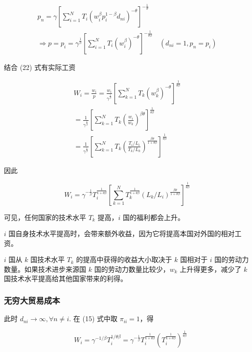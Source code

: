\documentclass[
]{article}
\begin{document}
\[
\begin{array}{l}{p_{n}=\gamma\left[\sum_{i=1}^{N} T_{i}\left(w_{i}^{\beta} p_{i}^{1-\beta} d_{n i}\right)^{-\theta}\right]^{-\frac{1}{\theta}}} \\ {\Rightarrow p=p_{i}=\gamma^{\frac{1}{\beta}}\left[\sum_{i=1}^{N} T_{i}\left(w_{i}^{\beta}\right)^{-\theta}\right]^{-\frac{1}{\theta \beta}} \quad\left(d_{n i}=1, p_{n}=p_{i}\right)}\end{array}
\]

结合 (22) 式有实际工资

\[
\begin{array}{l}{W_{i}=\frac{w_{i}}{p}=\frac{w_{i}}{\gamma^{\frac{1}{\beta}}}\left[\sum_{k=1}^{N} T_{k}\left(w_{k}^{\beta}\right)^{-\theta}\right]^{\frac{1}{\theta \beta}}} \\ {=\frac{1}{\gamma^{\frac{1}{\beta}}}\left[\sum_{k=1}^{N} T_{k}\left(\frac{w_{i}}{w_{k}}\right)^{\beta \theta}\right]^{\frac{1}{\theta \beta}}} \\ {=\frac{1}{\gamma^{\frac{1}{\beta}}}\left[\sum_{k=1}^{N} T_{k}\left(\frac{T_{i} / L_{i}}{T_{k} / L_{k}}\right)^{\frac{\beta \theta}{1+\theta \beta}}\right]^{\frac{1}{\theta \beta}}}\end{array}
\]

因此

\[
W_{i}=\gamma^{-\frac{1}{\beta}} T_{i}^{\frac{1}{1+\theta \beta}}\left[\sum_{k=1}^{N} T_{k}^{\frac{1}{1+\theta \beta}}\left(L_{k} / L_{i}\right)^{\frac{\beta \theta}{1+\theta \beta}}\right]^{\frac{1}{\theta \beta}} \tag{23}
\]

可见，任何国家的技术水平 \(T_k\) 提高，\(i\) 国的福利都会上升。

\(i\) 国自身技术水平提高时，会带来额外收益，因为它将提高本国对外国的相对工资。

\(i\) 国从 \(k\) 国技术水平 \(T_k\) 的提高中获得的收益大小取决于 \(k\) 国相对于 \(i\)
国的劳动力数量。如果技术进步来源国 \(k\) 国的劳动力数量比较少，\(w_k\)
上升得更多，减少了 \(k\) 国技术水平提高给其他国家带来的利得。

\hypertarget{ux65e0ux7a77ux5927ux8d38ux6613ux6210ux672c}{%
\subsubsection{无穷大贸易成本}\label{ux65e0ux7a77ux5927ux8d38ux6613ux6210ux672c}}

此时 \(d_{n i} \rightarrow \infty, \forall n \neq i\). 在 (15) 式中取
\(\pi_{ii}=1\)，得

\[
\quad W_{i}=\gamma^{-1 / \beta} T_{i}^{1 / \theta \beta}=\gamma^{-\frac{1}{\beta}} T_{i}^{\frac{1}{1+\theta \beta}}\left(T_{i}^{\frac{1}{1+\theta \beta}}\right)^{\frac{1}{\theta \beta}} \tag{24}
\]
\end{document}
